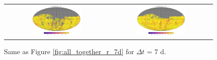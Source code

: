 \documentclass[preprintm,linenumbers]{aastex631}
\begin{document}
\begin{figure}
\begin{tabular}{c c}
         \includegraphics[width=0.5\textwidth]{results/skymaps_cutout/skymaps_cutout_delta_first_year_one_snap_v4_0_10yrs_db_noDD_noTwi_tscale-7_nside-256_doAllTemplateMetrics_reduceCount_g_noDD_noTwi.pdf} &
         \includegraphics[width=0.5\textwidth]{results/skymaps_cutout/skymaps_cutout_delta_first_year_one_snap_v4_0_10yrs_db_noDD_noTwi_tscale-7_nside-256_doAllTemplateMetrics_reduceCount_r_noDD_noTwi.pdf} \\

   \end{tabular}

        \caption{
        Same as Figure \ref{fig:all_together_r_7d} for $\Delta t$ = 7 d. 
        }
        \label{fig:_all_together_r_7d}
	\end{figure}

  
\end{document}
